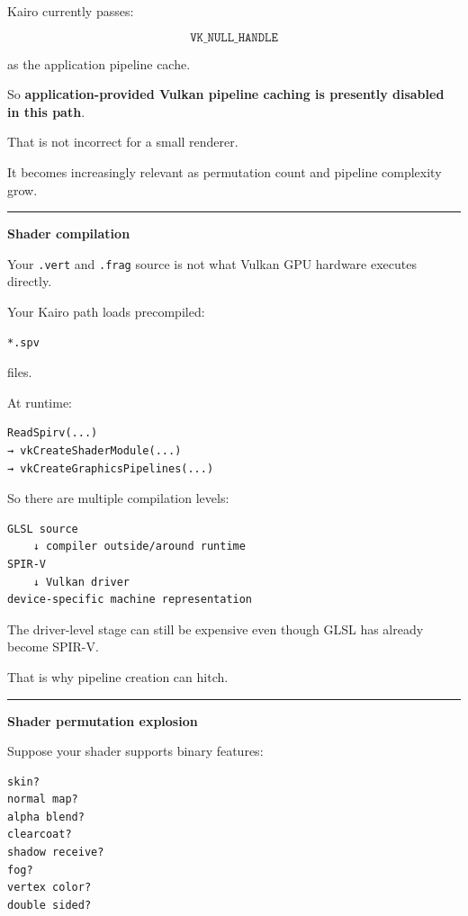 Kairo currently passes:

\[
\boxed{\texttt{VK_NULL_HANDLE}}
\]

as the application pipeline cache.

So \textbf{application-provided Vulkan pipeline caching is presently disabled in this path}.

That is not incorrect for a small renderer.

It becomes increasingly relevant as permutation count and pipeline complexity grow.

\begin{center}\rule{0.5\linewidth}{0.5pt}\end{center}

\textbf{Shader compilation}

Your \texttt{.vert} and \texttt{.frag} source is not what Vulkan GPU hardware executes directly.

Your Kairo path loads precompiled:

\begin{verbatim}
*.spv
\end{verbatim}

files.

At runtime:

\begin{verbatim}
ReadSpirv(...)
→ vkCreateShaderModule(...)
→ vkCreateGraphicsPipelines(...)
\end{verbatim}

So there are multiple compilation levels:

\begin{verbatim}
GLSL source
    ↓ compiler outside/around runtime
SPIR-V
    ↓ Vulkan driver
device-specific machine representation
\end{verbatim}

The driver-level stage can still be expensive even though GLSL has already become SPIR-V.

That is why pipeline creation can hitch.

\begin{center}\rule{0.5\linewidth}{0.5pt}\end{center}

\textbf{Shader permutation explosion}

Suppose your shader supports binary features:

\begin{verbatim}
skin?
normal map?
alpha blend?
clearcoat?
shadow receive?
fog?
vertex color?
double sided?
\end{verbatim}

